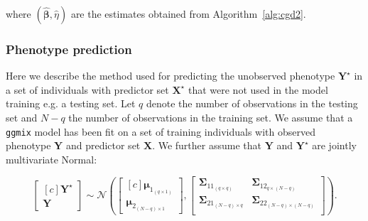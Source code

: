 \documentclass[10pt,letterpaper]{article}
\newcommand{\bX}{\textbf{X}}
\newcommand{\bY}{\textbf{Y}}
\newcommand{\bD}{\textbf{D}}
\newcommand{\bXtilde}{\widetilde{\bX}}
\newcommand{\bYtilde}{\widetilde{\bY}}
\newcommand{\bDtilde}{\widetilde{\bD}}
\newcommand{\bU}{\textbf{U}}
\newcommand{\bV}{\textbf{V}}
\newcommand{\bb}{\textbf{\emph{b}}}
\newcommand{\bSigma}{\boldsymbol{\Sigma}}
\newcommand{\bmu}{\boldsymbol{\mu}}
\newcommand{\bbeta}{\boldsymbol{\beta}}
\newcommand{\bPhi}{\boldsymbol{\Phi}}
\begin{document}
where $(\widehat{\bbeta}, \widehat{\eta})$ are the estimates obtained from Algorithm~\ref{alg:cgd2}.



\subsubsection*{Phenotype prediction} \label{phenoprediction}

Here we describe the method used for predicting the unobserved phenotype $\bY^\star$ in a set of individuals with predictor set $\bX^\star$ that were not used in the model training e.g. a testing set. Let $q$ denote the number of observations in the testing set and $N-q$ the number of observations in the training set. We assume that a \texttt{ggmix} model has been fit on a set of training individuals with observed phenotype $\bY$ and predictor set $\bX$.  We further assume that $\bY$ and $\bY^\star$ are jointly multivariate Normal:

\begin{equation*}
\left[ \begin{matrix*}[c]
\bY^\star \\
\bY
\end{matrix*}\right] \sim \mathcal{N} \left( \left[\begin{matrix*}[c]
\bmu_{1_{(q\times 1)}} \\
\bmu_{2_{(N-q)\times 1}}
\end{matrix*}\right], \left[ \begin{matrix}
\bSigma_{11_{(q\times q)}} & \bSigma_{12_{q\times (N-q)}} \\
\bSigma_{21_{(N-q)\times q}} & \bSigma_{22_{(N-q)\times (N-q)}}  \\
\end{matrix}   \right]  \right).
\end{equation*}
\end{document}
